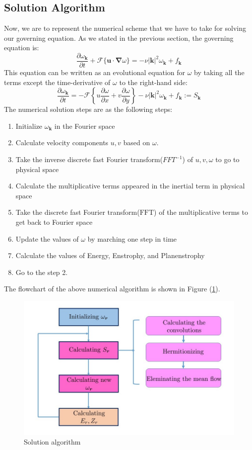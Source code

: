 \documentclass[12pt]{article}
\def\grad{\bm{\nabla}}
\def\k{\bm{k}}
\def\u{\bm{u}}
\begin{document}
\subsection{Solution Algorithm}
Now, we are to represent the numerical scheme that we have to take for solving our governing equation. As we stated in the previous section, the governing equation is:
%
\begin{equation}\label{Eq-14}
\frac{\partial\omega_{\k}}{\partial t} + \mathcal{F}\{\u\cdot\grad\omega\}= -\nu{|\k|}^2\omega_{\k} + f_{\k}
\end{equation}
%
This equation can be written as an evolutional equation for $\omega$ by taking all the terms except the time-derivative of $\omega$ to the right-hand side:
%
\begin{equation}\label{Eq-15}
\frac{\partial\omega_{\k}}{\partial t} =- \mathcal{F}\left\lbrace u\dfrac{\partial \omega}{\partial x}+v\dfrac{\partial \omega}{\partial y}\right\rbrace -\nu{|\k|}^2\omega_{\k} + f_{\k} :=S_{\k}
\end{equation}
%
The numerical solution steps are as the following steps:
\begin{enumerate}
\item Initialize $\omega_{\k}$ in the Fourier space
\item Calculate velocity components $u,v$ based on $\omega$.
\item Take the inverse discrete fast Fourier transform($FFT^{-1}$) of $u,v,\omega$ to go to physical space
\item Calculate the multiplicative terms appeared in the inertial term in physical space
\item Take the discrete fast Fourier transform($\text{FFT}$) of the multiplicative terms to get back to Fourier space
\item Update the values of $\omega$ by marching one step in time
\item Calculate the values of Energy, Enstrophy, and Planenstrophy
\item Go to the step 2.
\end{enumerate}
The flowchart of the above numerical algorithm is shown in Figure (\ref{Fig-2}).
%
\begin{figure}[h]
\centering
\includegraphics{algorithm}
\caption{Solution algorithm}\label{Fig-2}
\end{figure}
%
\end{document}
